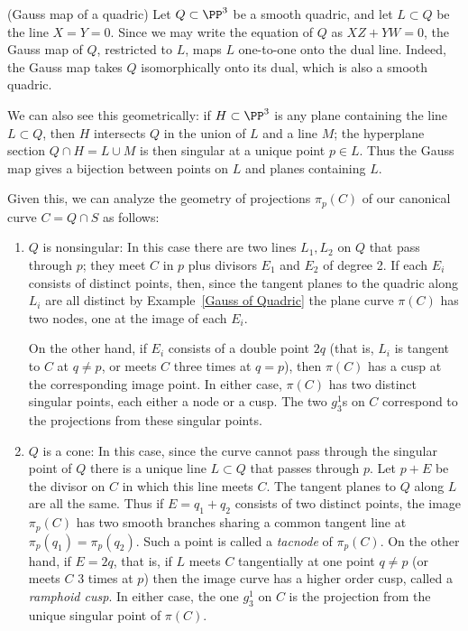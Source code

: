 \begin{example} (Gauss map of a quadric)\label{Gauss of Quadric}
 Let $Q\subset \PP^3$ be a smooth quadric, and let $L\subset Q$ be the line $X=Y =0$. Since we may write the equation of $Q$ as $XZ+YW = 0$, the Gauss map of $Q$, restricted to $L$, maps $L$ one-to-one onto the dual line. Indeed, the Gauss map takes $Q$ isomorphically onto its dual, which is also a smooth quadric.
 
 We can also see this geometrically: if $H \subset \PP^3$ is any plane containing the line $L \subset Q$, then $H$ intersects $Q$ in the union of $L$ and a line $M$; the hyperplane section $Q \cap H = L \cup M$ is then singular at a unique point $p \in L$. Thus the Gauss map gives a bijection between points on $L$ and planes containing $L$. 
\end{example}

Given this, we can analyze the geometry of projections $\pi_p(C)$ of our canonical curve $C = Q \cap S$ as follows:

\begin{enumerate}
\item $Q$ is nonsingular:
In this case there are two lines $L_1, L_2$ on $Q$ that pass through $p$; they meet $C$ in $p$ plus divisors $E_1$ and $E_2$ of degree 2. If each $E_i$ consists of distinct points, then, since the tangent planes to the quadric along $L_i$ are all distinct by Example~\ref{Gauss of Quadric} the plane curve $\pi(C)$ has two nodes, one at the image of each $E_i$.

On the other hand, if $E_i$ consists of a double point $2q$ (that is, $L_i$ is tangent to $C$ at $q\neq p$, or meets $C$ three times at $q = p$), then $\pi(C)$ has a cusp at the corresponding image point. 
In either case, $\pi(C)$ has two distinct singular points, each either a node or a cusp. The two $g^1_3$s on $C$ correspond to the projections from these singular points.

\item $Q$ is a cone:
In this case, since the curve cannot pass through the singular point of $Q$ there is a unique line $L\subset Q$ that passes through $p$. Let $p+E$ be the divisor on $C$ in which this line meets $C$. The tangent planes to $Q$ along $L$ are all the same. Thus if $E = q_1+q_2$ consists of two distinct points, the image $\pi_p(C)$ has two smooth branches sharing a common tangent line at
$\pi_p(q_1) = \pi_p(q_2)$. Such a point is called a \emph{tacnode} of $\pi_p(C)$. On the other hand, if $E= 2q$, that is, if $L$ meets $C$ tangentially at one point $q\neq p$ (or meets $C$ 3 times at $p$) then the image curve has a higher order cusp, called a \emph{ramphoid cusp}. In either case, the one $g^1_3$ on $C$ is the projection from the unique singular point of $\pi(C)$.
\end{enumerate}

